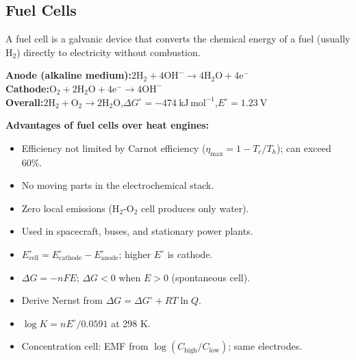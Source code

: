 \documentclass[12pt,a4paper]{article}
\begin{document}
\subsection{Fuel Cells}
A fuel cell is a galvanic device that converts the chemical energy of a fuel (usually H$_2$) directly to electricity without combustion.

\begin{tcolorbox}[formulabox, title={Hydrogen--Oxygen Fuel Cell Reactions}]
\textbf{Anode (alkaline medium):}\quad $\mathrm{2H_2 + 4OH^- \to 4H_2O + 4e^-}$\\
\textbf{Cathode:}\quad $\mathrm{O_2 + 2H_2O + 4e^- \to 4OH^-}$\\
\textbf{Overall:}\quad $\mathrm{2H_2 + O_2 \to 2H_2O}$,\quad $\Delta G^\circ = -474\ \mathrm{kJ\,mol^{-1}}$,\quad $E^\circ = 1.23\ \mathrm{V}$
\end{tcolorbox}

\textbf{Advantages of fuel cells over heat engines:}
\begin{itemize}[leftmargin=*, itemsep=1pt, topsep=2pt]
  \item Efficiency not limited by Carnot efficiency ($\eta_{\mathrm{max}} = 1-T_c/T_h$); can exceed 60\%.
  \item No moving parts in the electrochemical stack.
  \item Zero local emissions (H$_2$-O$_2$ cell produces only water).
  \item Used in spacecraft, buses, and stationary power plants.
\end{itemize}

\begin{tcolorbox}[exambox, title={Exam Points (Section 4)}]
\begin{itemize}[leftmargin=*, itemsep=2pt, topsep=2pt]
  \item $E^\circ_{\mathrm{cell}} = E^\circ_{\mathrm{cathode}} - E^\circ_{\mathrm{anode}}$; higher $E^\circ$ is cathode.
  \item $\Delta G = -nFE$; $\Delta G < 0$ when $E > 0$ (spontaneous cell).
  \item Derive Nernst from $\Delta G = \Delta G^\circ + RT\ln Q$.
  \item $\log K = n E^\circ / 0.0591$ at 298 K.
  \item Concentration cell: EMF from $\log(C_{\mathrm{high}}/C_{\mathrm{low}})$; same electrodes.
\end{itemize}
\end{tcolorbox}

\end{document}
